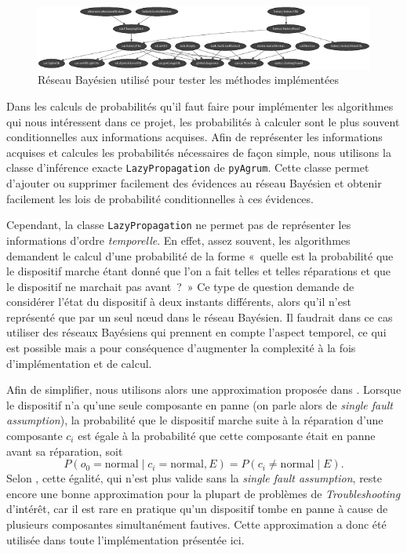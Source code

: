 \documentclass[a4paper,11pt]{article}
\theoremstyle{plain}
\theoremstyle{definition}
\begin{document}
\begin{figure}[ht]
\centering
\includegraphics[width=\textwidth]{Figures/simpleCar2.pdf}
\caption{Réseau Bayésien utilisé pour tester les méthodes implémentées}
\label{FigReseauBayes}
\end{figure}

Dans les calculs de probabilités qu'il faut faire pour implémenter les algorithmes qui nous intéressent dans ce projet, les probabilités à calculer sont le plus souvent conditionnelles aux informations acquises. Afin de représenter les informations acquises et calcules les probabilités nécessaires de façon simple, nous utilisons la classe d'inférence exacte \texttt{LazyPropagation} de \texttt{pyAgrum}. Cette classe permet d'ajouter ou supprimer facilement des évidences au réseau Bayésien et obtenir facilement les lois de probabilité conditionnelles à ces évidences.

Cependant, la classe \texttt{LazyPropagation} ne permet pas de représenter les informations d'ordre \emph{temporelle}. En effet, assez souvent, les algorithmes demandent le calcul d'une probabilité de la forme «~quelle est la probabilité que le dispositif marche étant donné que l'on a fait telles et telles réparations et que le dispositif ne marchait pas avant~?~» Ce type de question demande de considérer l'état du dispositif à deux instants différents, alors qu'il n'est représenté que par un seul nœud dans le réseau Bayésien. Il faudrait dans ce cas utiliser des réseaux Bayésiens qui prennent en compte l'aspect temporel, ce qui est possible mais a pour conséquence d'augmenter la complexité à la fois d'implémentation et de calcul.

Afin de simplifier, nous utilisons alors une approximation proposée dans \cite{Heckerman_1995, heckerman1994troubleshooting}. Lorsque le dispositif n'a qu'une seule composante en panne (on parle alors de \emph{single fault assumption}), la probabilité que le dispositif marche suite à la réparation d'une composante $c_i$ est égale à la probabilité que cette composante était en panne avant sa réparation, soit
\[
P(o_0 = \text{normal} \mid c_i = \text{normal}, E) = P(c_i \neq \text{normal} \mid E).
\]
Selon \cite{Heckerman_1995, heckerman1994troubleshooting}, cette égalité, qui n'est plus valide sans la \emph{single fault assumption}, reste encore une bonne approximation pour la plupart de problèmes de \emph{Troubleshooting} d'intérêt, car il est rare en pratique qu'un dispositif tombe en panne à cause de plusieurs composantes simultanément fautives. Cette approximation a donc été utilisée dans toute l'implémentation présentée ici.
\end{document}
